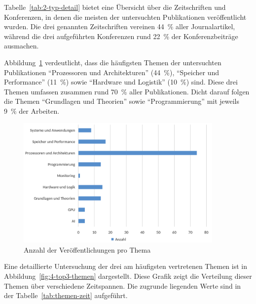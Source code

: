 Tabelle~\ref{tab:2-typ-detail} bietet eine Übersicht über die Zeitschriften und Konferenzen, in denen die meisten der untersuchten Publikationen veröffentlicht wurden. Die drei genannten Zeitschriften vereinen 44~\% aller Journalartikel, während die drei aufgeführten Konferenzen rund 22~\% der Konferenzbeiträge ausmachen.

Abbildung~\ref{fig:3-anzahl-themen} verdeutlicht, dass die häufigsten Themen der untersuchten Publikationen \enquote{Prozessoren und Architekturen} (44~\%), \enquote{Speicher und Performance} (11~\%) sowie \enquote{Hardware und Logistik} (10~\%) sind. Diese drei Themen umfassen zusammen rund 70~\% aller Publikationen. Dicht darauf folgen die Themen \enquote{Grundlagen und Theorien} sowie \enquote{Programmierung} mit jeweils 9~\% der Arbeiten.

\begin{figure}[!h]
    \centering
    \includegraphics[width=0.90\textwidth]{graphics_lit/3-thema.png}
    \caption{Anzahl der Veröffentlichungen pro Thema}
    \label{fig:3-anzahl-themen}
\end{figure}

Eine detaillierte Untersuchung der drei am häufigsten vertretenen Themen ist in Abbildung~\ref{fig:4-top3-themen} dargestellt. Diese Grafik zeigt die Verteilung dieser Themen über verschiedene Zeitspannen. Die zugrunde liegenden Werte sind in der Tabelle~\ref{tab:themen-zeit} aufgeführt.

